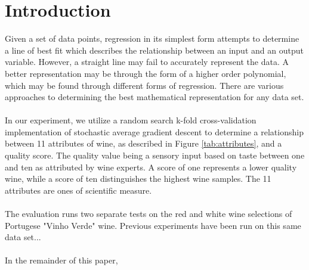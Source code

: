 
\section{Introduction}
\label{sec:intro}

Given a set of data points, regression in its simplest form attempts to 
determine a line of best fit which describes the relationship between an
input and an output variable. However, a straight line may fail to
accurately represent the data. A better representation may be through
the form of a higher order polynomial, which may be found through different
forms of regression. There are various approaches 
to determining the best mathematical representation for any data set.
\\ \\
In our experiment, we utilize a random search k-fold cross-validation implementation of stochastic
average gradient descent to determine a relationship between 11 attributes of wine,
as described in Figure \ref{tab:attributes}, and a quality score. The quality value being a sensory input based on taste between one and ten as attributed by wine experts. A score of one represents a lower quality wine, while a score of ten distinguishes the highest wine samples. The 11 attributes are ones of scientific measure.
\\ \\
The evaluation runs two separate tests on the red and white wine 
selections of Portugese "Vinho Verde" wine. Previous experiments 
have been run on this same data set...
\\ \\
In the remainder of this paper, 



